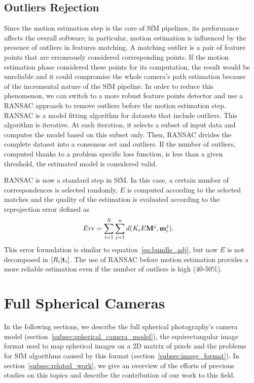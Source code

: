 \subsection{Outliers Rejection}
Since the motion estimation step is the core of SfM pipelines, its performance
affects the overall software; in particular, motion estimation is influenced 
by the presence of outliers in features matching.
A matching outlier is a pair of feature points that are erroneously considered 
corresponding points. If the motion estimation phase considered these points for
its computation, the result would be unreliable and it could compromise the 
whole camera's path estimation because of the incremental nature of the SfM 
pipeline.
In order to reduce this phenomenon, we can switch to a more robust feature points
detector and use a RANSAC approach to remove outliers before the motion estimation step.
RANSAC\cite{fischler1981random} is a model fitting algorithm for datasets that include outliers.
This algorithm is iterative. At each iteration, it selects a subset of input data and computes the model based on this subset only. Then, RANSAC divides the complete dataset into a consensus set and outliers. If the number of outliers, computed thanks to a problem specific loss function, is
less than a given threshold, the estimated model is considered valid.

RANSAC is now a standard step in SfM. In this case, a certain number of correspondences is selected randomly, $E$ is computed 
according to the selected matches and the quality of the estimation is evaluated 
according to the reprojection error defined as
%
\begin{equation*}
	Err =  
	\sum_{i = 1}^N\sum_{j = 1}^n 
	d(K_iE\mathbf{M}^j, \mathbf{m}_i^j) \text{.}
\end{equation*}
%
This error formulation is similar to equation~\ref{eq:bundle_adj}, 
but now $E$ is not decomposed in $[R_i|\mathbf{t}_i]$. The use of RANSAC before motion estimation provides a more reliable 
estimation even if the number of outliers is high (40-50\%).

\section{Full Spherical Cameras}
In the following sections, we describe the full spherical photography's camera
model (section~\ref{subsec:spherical_camera_model}), the equirectangular image 
format used to map spherical images on a 2D matrix of pixels 
and the problems for SfM algorithms caused by this format 
(section~\ref{subsec:image_format}).
In section~\ref{subsec:related_work}, we give an overview of the efforts of 
previous studies on this topics and describe the contribution of our work to 
this field.

